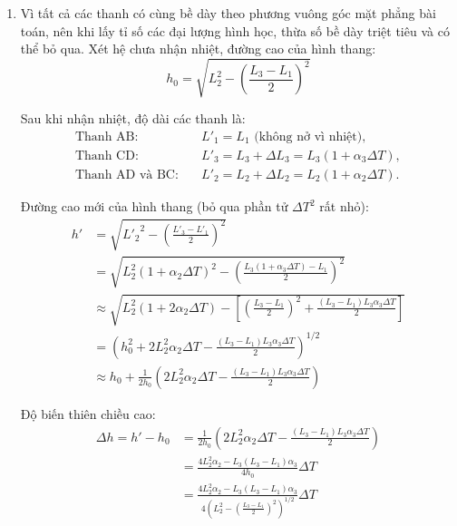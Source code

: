 \renewcommand{\theequation}{5.\arabic{equation}}
\begin{enumerate}[label=(\alph*)]
\item
Vì tất cả các thanh có cùng bề dày theo phương vuông góc mặt phẳng bài toán, nên khi lấy tỉ số các đại lượng hình học, thừa số bề dày triệt tiêu và có thể bỏ qua. Xét hệ chưa nhận nhiệt, đường cao của hình thang:
\begin{equation}
  h_0=\sqrt{L_2^2 - \left(\frac{L_3-L_1}{2}\right)^2}
\end{equation}

Sau khi nhận nhiệt, độ dài các thanh là:
\begin{equation}
\begin{aligned}
  \text{Thanh AB}:\quad &L'_1=L_1 \text{ (không nở vì nhiệt)},\\
  \text{Thanh CD}:\quad &L'_3=L_3+\Delta L_3=L_3(1+\alpha_3\Delta T),\\
  \text{Thanh AD và BC}:\quad &L'_2=L_2+\Delta L_2=L_2(1+\alpha_2\Delta T).
\end{aligned}
\end{equation}

Đường cao mới của hình thang (bỏ qua phần tử $\Delta T^2$ rất nhỏ):
\begin{equation}
  \begin{aligned}
  h'&=\sqrt{{L'_2}^2-\left(\frac{{L'_3}-{L'_1}}{2}\right)^2}\\
    &=\sqrt{L_2^2(1+\alpha_2\Delta T)^2-\left(\frac{L_3(1+\alpha_3\Delta T)-L_1}{2}\right)^2}\\
    &\approx \sqrt{L_2^2(1+2\alpha_2\Delta T)-\left[\left(\frac{L_3-L_1}{2}\right)^2+\frac{(L_3-L_1)L_3\alpha_3\Delta T}{2}\right]}\\
    &=\left(h_0^2+2L_2^2\alpha_2\Delta T-\frac{(L_3-L_1)L_3\alpha_3\Delta T}{2}\right)^{1/2}\\
    &\approx h_0+\frac{1}{2h_0}\left(2L_2^2\alpha_2\Delta T-\frac{(L_3-L_1)L_3\alpha_3\Delta T}{2}\right)
  \end{aligned}
\end{equation}

Độ biến thiên chiều cao:
\begin{equation}
\begin{aligned}
  \Delta h = h'-h_0 &= \frac{1}{2h_0}\left(2L_2^2\alpha_2\Delta T-\frac{(L_3-L_1)L_3\alpha_3\Delta T}{2}\right) \\
  &=\frac{4L_2^2\alpha_2 - L_3(L_3-L_1)\alpha_3}{4h_0} \Delta T \\
  &= \frac{4L_2^2\alpha_2-L_3(L_3-L_1)\alpha_3}{4\left(L_2^2-\left(\frac{L_3-L_1}{2}\right)^2\right)^{1/2}}\Delta T
\end{aligned}
\end{equation}


\end{enumerate}
